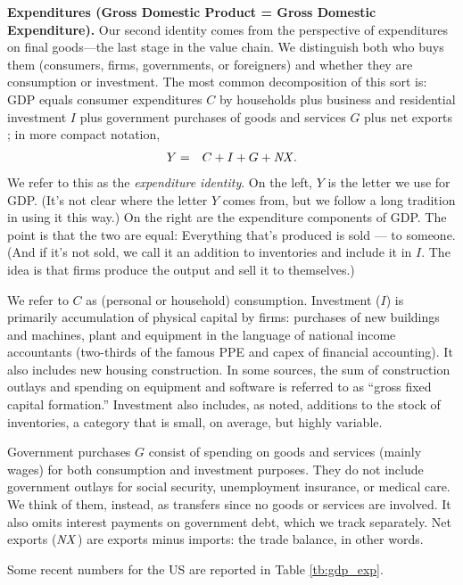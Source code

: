 \textbf{Expenditures (Gross Domestic Product = Gross Domestic Expenditure).}
Our second identity comes from the perspective of expenditures on final goods---the last stage in the value chain.
We distinguish both who buys them (consumers, firms, governments, or foreigners)
and whether they are consumption or investment.
The most common decomposition
of this sort is: GDP equals consumer expenditures $C$ by households
plus business and residential investment $I$
plus government purchases of goods and services $G$
plus net exports \NX; in more compact notation,
\begin{eqnarray}
    Y &=& C+I+G+\mbox{\em NX\/} .
    \label{eq:exp-identity}
\end{eqnarray}
We refer to this as the {\it expenditure identity\/}.
On the left, $Y$ is the letter we use for GDP.
(It's not clear where the letter $Y$ comes from, but we follow a long tradition in using it this way.)
On the right are the expenditure components of GDP.
The point is that the two are equal:
Everything that's produced is sold --- to someone.
(And if it's not sold, we call it an addition to inventories
and include it in $I$.
The idea is that firms produce the output and sell it to themselves.)


We refer to $C$ as (personal or household) consumption.
Investment ($I$) is primarily accumulation of physical capital by firms:
purchases of new buildings and machines, plant and equipment in
the language of national income accountants (two-thirds of the
famous PPE and capex of financial accounting). It also includes new housing construction.
In some sources, the sum of construction outlays and spending on equipment and software is referred to as ``gross fixed capital formation.''
Investment also includes, as noted, additions to the stock of inventories,
a category that is small, on average, but highly variable.


Government purchases $G$ consist of spending on goods and
services (mainly wages) for both consumption and investment purposes.
They do not include government outlays
for social security, unemployment insurance, or medical care.
We think of them, instead, as transfers since no goods or
services are involved.
It also omits interest payments on government debt, which we track separately.
Net exports ($\mbox{\em NX\/}$) are exports minus imports: the trade balance, in other words.

Some recent numbers for the US are reported in Table \ref{tb:gdp_exp}.

